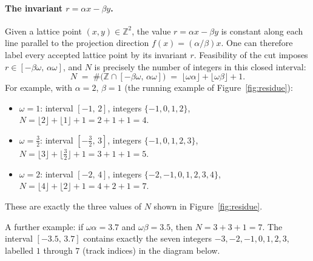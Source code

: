 \documentclass{amsart}
\theoremstyle{definition}
\theoremstyle{plain}
\theoremstyle{remark}
\begin{document}
\paragraph{The invariant \(r = \alpha x - \beta y\).}
Given a lattice point \((x,y)\in\mathbb{Z}^2\), the value \(r = \alpha x - \beta y\)
is constant along each line parallel to the projection direction \(f(x)=(\alpha/\beta)x\).
One can therefore label every accepted lattice point by its invariant \(r\).
Feasibility of the cut imposes \(r \in [-\beta\omega,\,\alpha\omega]\), and
\(N\) is precisely the number of integers in this closed interval:
\[
  N \;=\; \#\bigl(\mathbb{Z}\cap[-\beta\omega,\,\alpha\omega]\bigr)
    \;=\; \lfloor\omega\alpha\rfloor + \lfloor\omega\beta\rfloor + 1.
\]
For example, with \(\alpha=2\), \(\beta=1\) (the running example of Figure~\ref{fig:residue}):
\begin{itemize}
  \item \(\omega = 1\): interval \([-1,\,2]\),
    integers \(\{-1,0,1,2\}\),
    \(N = \lfloor 2\rfloor + \lfloor 1\rfloor + 1 = 2+1+1 = 4\).
  \item \(\omega = \tfrac{3}{2}\): interval \([-\tfrac{3}{2},\,3]\),
    integers \(\{-1,0,1,2,3\}\),
    \(N = \lfloor 3\rfloor + \lfloor \tfrac{3}{2}\rfloor + 1 = 3+1+1 = 5\).
  \item \(\omega = 2\): interval \([-2,\,4]\),
    integers \(\{-2,-1,0,1,2,3,4\}\),
    \(N = \lfloor 4\rfloor + \lfloor 2\rfloor + 1 = 4+2+1 = 7\).
\end{itemize}
These are exactly the three values of \(N\) shown in Figure~\ref{fig:residue}.

A further example: if \(\omega\alpha = 3.7\) and \(\omega\beta = 3.5\), then
\(N = 3 + 3 + 1 = 7\).  The interval \([-3.5,\,3.7]\) contains exactly the
seven integers \(-3,-2,-1,0,1,2,3\), labelled \(1\) through \(7\) (track
indices) in the diagram below.

\begin{center}
\end{center}
\end{document}
